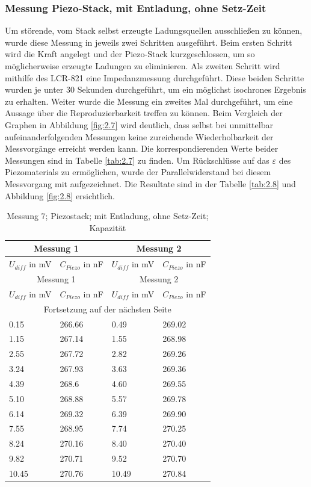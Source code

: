\documentclass[12pt]{scrreprt} %
\begin{document}
\subsubsection{Messung Piezo-Stack, mit Entladung, ohne Setz-Zeit}
Um störende, vom Stack selbst erzeugte Ladungsquellen ausschließen zu können, wurde diese Messung in jeweils zwei Schritten ausgeführt. Beim ersten Schritt wird die Kraft angelegt und der Piezo-Stack kurzgeschlossen, um so möglicherweise erzeugte Ladungen zu eliminieren. Als zweiten Schritt wird mithilfe des LCR-821 eine Impedanzmessung durchgeführt. Diese beiden Schritte wurden je unter 30 Sekunden durchgeführt, um ein möglichst isochrones Ergebnis zu erhalten. 
Weiter wurde die Messung ein zweites Mal durchgeführt, um eine Aussage über die Reproduzierbarkeit treffen zu können. Beim Vergleich der Graphen in Abbildung \vref{fig:2.7} wird deutlich, dass selbst bei unmittelbar aufeinanderfolgenden Messungen keine zureichende Wiederholbarkeit der Messvorgänge erreicht werden kann. Die korrespondierenden Werte beider Messungen sind in Tabelle \vref{tab:2.7} zu finden.
Um Rückschlüsse auf das $\varepsilon$ des Piezomaterials zu ermöglichen, wurde der Parallelwiderstand bei diesem Messvorgang mit aufgezeichnet. Die Resultate sind in der Tabelle \vref{tab:2.8} und Abbildung \vref{fig:2.8} ersichtlich.

\setlongtables
\begin{longtable}{| l | l | l | l |}
\caption{Messung 7; Piezostack; mit Entladung, ohne Setz-Zeit; Kapazität}\\
\hline
\multicolumn{2}{|c|}{Messung 1} &\multicolumn{2}{|c|}{Messung 2}\\
\hline
$U_{diff}$ in mV&$C_{Piezo}$ in nF&$U_{diff}$ in mV&$C_{Piezo}$ in nF\\
\hline
\endfirsthead
\hline
\multicolumn{2}{|c|}{Messung 1} &\multicolumn{2}{|c|}{Messung 2}\\
\hline
$U_{diff}$ in mV&$C_{Piezo}$ in nF&$U_{diff}$ in mV&$C_{Piezo}$ in nF\\
\hline
\endhead
\hline
\multicolumn{4}{|c|}{Fortsetzung auf der nächsten Seite}\\
\hline
\endfoot
\hline \hline
\endlastfoot
\hline
\label{tab:2.7}%
0.15&266.66&0.49&269.02\\
1.15&267.14&1.55&268.98\\
2.55&267.72&2.82&269.26\\
3.24&267.93&3.63&269.36\\
4.39&268.6&4.60&269.55\\
5.10&268.88&5.57&269.78\\
6.14&269.32&6.39&269.90\\
7.55&268.95&7.74&270.25\\
8.24&270.16&8.40&270.40\\
9.82&270.71&9.52&270.70\\
10.45&270.76&10.49&270.84\\
\end{longtable}
\end{document}
